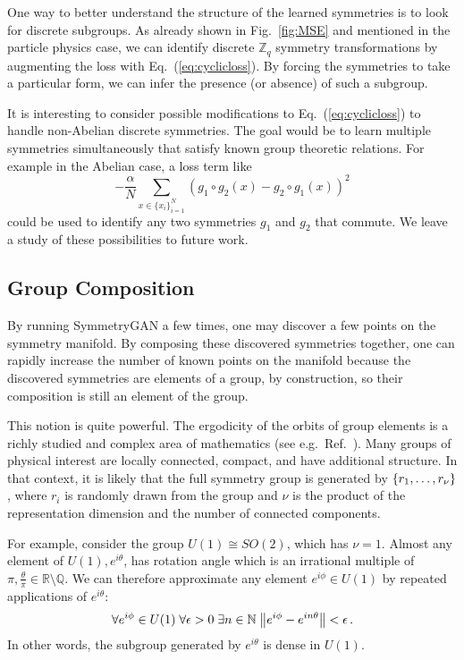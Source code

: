 \documentclass[aps,prx,reprint,preprintnumbers,superscriptaddress,nofootinbib,longbibliography,floatfix]{revtex4-1}
\newcommand{\R}{\mathbb{R}}
\newcommand{\Z}{\mathbb{Z}}
\DeclareRobustCommand{\Fig}[1]{Fig.~\ref{fig:#1}}
\DeclareRobustCommand{\Eq}[1]{Eq.~(\ref{eq:#1})}
\DeclareRobustCommand{\Ref}[1]{Ref.~\cite{#1}}
\begin{document}
One way to better understand the structure of the learned symmetries is to look for discrete subgroups.
%
As already shown in \Fig{MSE} and mentioned in the particle physics case, we can identify discrete $\Z_q$ symmetry transformations by augmenting the loss with \Eq{cyclicloss}.
% 
By forcing the symmetries to take a particular form, we can infer the presence (or absence) of such a subgroup.


It is interesting to consider possible modifications to \Eq{cyclicloss} to handle non-Abelian discrete symmetries.
%
The goal would be to learn multiple symmetries simultaneously that satisfy known group theoretic relations.
%
For example in the Abelian case, a loss term like 
%
\begin{equation}
\label{eq:abeliansymm}
    -\frac\alpha N\sum_{x\in\{x_i\}_{i=1}^N}(g_1 \circ g_2(x) - g_2 \circ g_1(x))^2
\end{equation}
%
could be used to identify any two symmetries $g_1$ and $g_2$ that commute.
%
We leave a study of these possibilities to future work.


\subsection{Group Composition}

By running SymmetryGAN a few times, one may discover a few points on the symmetry manifold.
%
By composing these discovered symmetries together, one can rapidly increase the number of known points on the manifold because the discovered symmetries are elements of a group, by construction, so their composition is still an element of the group.


This notion is quite powerful.
%
The ergodicity of the orbits of group elements is a richly studied and complex area of mathematics (see e.g.~\Ref{bams/1183548783}).
%
Many groups of physical interest are locally connected, compact, and have additional structure.
%
In that context, it is likely that the full symmetry group is generated by $\qty{r_1,\dots, r_\nu}$, where $r_i$ is randomly drawn from the group and $\nu$ is the product of the representation dimension and the number of connected components.

For example, consider the group $U(1)\cong SO(2)$, which has $\nu=1$.
%
Almost any element of $U(1), e^{i\theta}$, has rotation angle which is an irrational multiple of $\pi, \frac\theta\pi\in\R\setminus\mathbb{Q}$.
%
We can therefore approximate any element $e^{i\phi}\in U(1)$ by repeated applications of $e^{i\theta}$:
%
\begin{equation}
    \forall e^{i\phi}\in U(1)\;\forall\epsilon > 0\;\exists n\in \mathbb{N}\; \norm{e^{i\phi} - e^{in\theta}} < \epsilon\,.
\end{equation}
%
In other words, the subgroup generated by $e^{i\theta}$ is dense in $U(1)$.
\end{document}

